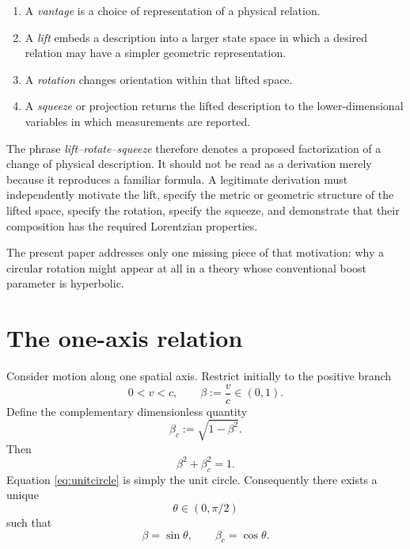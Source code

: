 \documentclass[11pt]{article}
\begin{document}
\begin{enumerate}[label=(\roman*)]
\item A \emph{vantage} is a choice of representation of a physical relation.
\item A \emph{lift} embeds a description into a larger state space in which a
desired relation may have a simpler geometric representation.
\item A \emph{rotation} changes orientation within that lifted space.
\item A \emph{squeeze} or projection returns the lifted description to the
lower-dimensional variables in which measurements are reported.
\end{enumerate}

The phrase \emph{lift--rotate--squeeze} therefore denotes a proposed
factorization of a change of physical description. It should not be read as a
derivation merely because it reproduces a familiar formula. A legitimate
derivation must independently motivate the lift, specify the metric or
geometric structure of the lifted space, specify the rotation, specify the
squeeze, and demonstrate that their composition has the required Lorentzian
properties.

The present paper addresses only one missing piece of that motivation: why a
circular rotation might appear at all in a theory whose conventional boost
parameter is hyperbolic.

\section{The one-axis relation}

Consider motion along one spatial axis. Restrict initially to the positive
branch
\begin{equation}
0<v<c,
\qquad
\beta:=\frac{v}{c}\in(0,1).
\label{eq:beta}
\end{equation}
Define the complementary dimensionless quantity
\begin{equation}
\beta_c:=\sqrt{1-\beta^2}.
\label{eq:betac}
\end{equation}
Then
\begin{equation}
\beta^2+\beta_c^2=1.
\label{eq:unitcircle}
\end{equation}
Equation \eqref{eq:unitcircle} is simply the unit circle. Consequently there
exists a unique
\begin{equation}
\theta\in(0,\pi/2)
\end{equation}
such that
\begin{equation}
\beta=\sin\theta,
\qquad
\beta_c=\cos\theta.
\label{eq:circularparam}
\end{equation}
\end{document}

